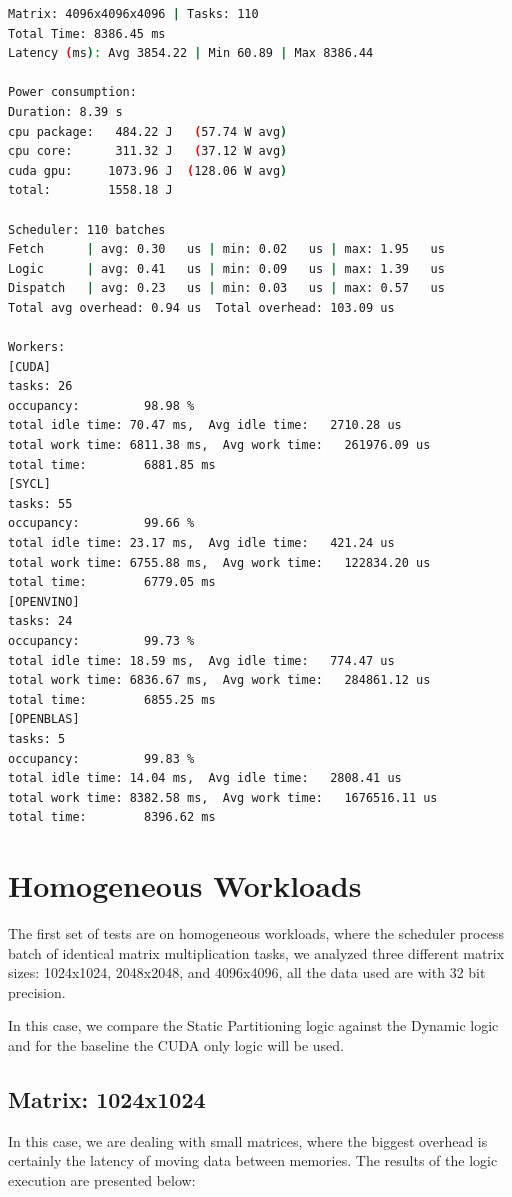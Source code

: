 \begin{lstlisting}[caption={Example of Scheduler Execution Output}, label={executionlog}, language=bash]
Matrix: 4096x4096x4096 | Tasks: 110
Total Time: 8386.45 ms
Latency (ms): Avg 3854.22 | Min 60.89 | Max 8386.44

Power consumption:
Duration: 8.39 s
cpu package:   484.22 J   (57.74 W avg)
cpu core:      311.32 J   (37.12 W avg)
cuda gpu:     1073.96 J  (128.06 W avg)
total:        1558.18 J

Scheduler: 110 batches
Fetch      | avg: 0.30   us | min: 0.02   us | max: 1.95   us
Logic      | avg: 0.41   us | min: 0.09   us | max: 1.39   us
Dispatch   | avg: 0.23   us | min: 0.03   us | max: 0.57   us
Total avg overhead: 0.94 us  Total overhead: 103.09 us

Workers:
[CUDA]
tasks: 26
occupancy:         98.98 %
total idle time: 70.47 ms,  Avg idle time:   2710.28 us
total work time: 6811.38 ms,  Avg work time:   261976.09 us
total time:        6881.85 ms
[SYCL]
tasks: 55
occupancy:         99.66 %
total idle time: 23.17 ms,  Avg idle time:   421.24 us
total work time: 6755.88 ms,  Avg work time:   122834.20 us
total time:        6779.05 ms
[OPENVINO]
tasks: 24
occupancy:         99.73 %
total idle time: 18.59 ms,  Avg idle time:   774.47 us
total work time: 6836.67 ms,  Avg work time:   284861.12 us
total time:        6855.25 ms
[OPENBLAS]
tasks: 5
occupancy:         99.83 %
total idle time: 14.04 ms,  Avg idle time:   2808.41 us
total work time: 8382.58 ms,  Avg work time:   1676516.11 us
total time:        8396.62 ms
\end{lstlisting}

\clearpage 

\section{Homogeneous Workloads}
The first set of tests are on homogeneous workloads, where the scheduler process batch of identical matrix multiplication tasks, we analyzed three different matrix sizes: 1024x1024, 2048x2048, and 4096x4096, all the data used are with 32 bit precision.

In this case, we compare the Static Partitioning logic against the Dynamic logic and for the baseline the CUDA only logic will be used. 

\subsection{Matrix: 1024x1024}
In this case, we are dealing with small matrices, where the biggest overhead is certainly the latency of moving data between memories. The results of the logic execution are presented below:

